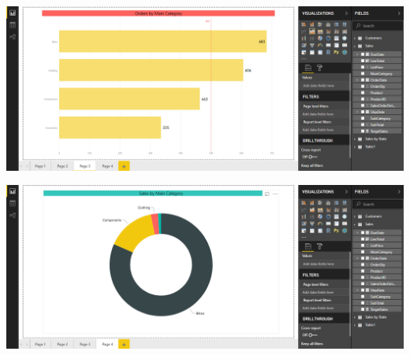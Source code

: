	\begin{center}
	\includegraphics[width=18cm]{./Imagenes/EJER2T1(4)}
	\end{center}	
\newpage
	\begin{center}
	\includegraphics[width=18cm]{./Imagenes/EJER2T1(5)}
	\end{center}	

	
